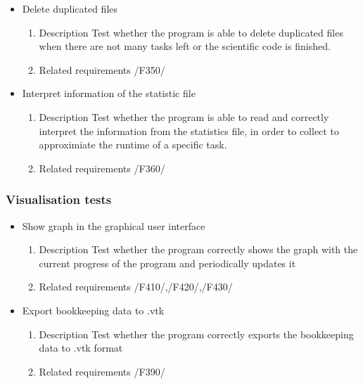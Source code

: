 {\begin{itemize}
				
				
				\item Delete duplicated files 
				\begin{enumerate}
					\item Description\newline
Test whether the program is able to delete duplicated files when there are not many tasks left or the scientific code is finished.
					\item Related requirements\newline
					/F350/
				\end{enumerate}
				
				
				
				\item Interpret information of the statistic file
				\begin{enumerate}
					\item Description\newline
Test whether the program is able to read and correctly interpret the information from the statistics file, in order to collect to approximiate the runtime of a specific task.
					\item Related requirements\newline
					/F360/
				\end{enumerate}
				
		\end{itemize}		
		\subsubsection{Visualisation tests}%
		\begin{itemize}
		
				\item Show graph in the graphical user interface
				\begin{enumerate}
					\item Description\newline
Test whether the program correctly shows the graph with the current progress of the program and periodically updates it
					\item Related requirements\newline
					/F410/,/F420/,/F430/
				\end{enumerate}
				
		
				\item Export bookkeeping data to .vtk
				\begin{enumerate}
					\item Description\newline
Test whether the program correctly exports the bookkeeping data to .vtk format
					\item Related requirements\newline
					/F390/
				\end{enumerate}
				

\end{itemize}}
